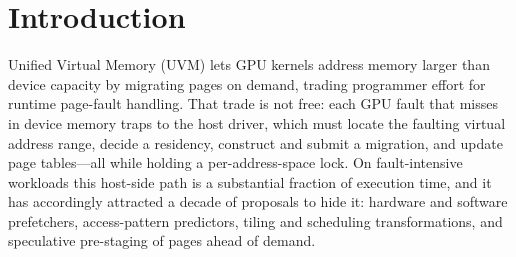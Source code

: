 %
%

\section{Introduction}

Unified Virtual Memory (UVM) lets GPU kernels address memory larger than device
capacity by migrating pages on demand, trading programmer effort for runtime
page-fault handling. That trade is not free: each GPU fault that misses in
device memory traps to the host driver, which must locate the faulting virtual
address range, decide a residency, construct and submit a migration, and update
page tables---all while holding a per-address-space lock. On fault-intensive
workloads this host-side path is a substantial fraction of execution time, and
it has accordingly attracted a decade of proposals to hide it: hardware and
software prefetchers, access-pattern predictors, tiling and scheduling
transformations, and speculative pre-staging of pages ahead of demand.

